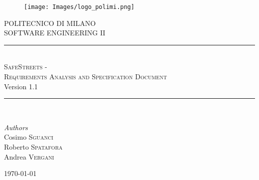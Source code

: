 \documentclass[11pt,a4paper]{article}
\begin{document}
\begin{figure}[t]
    \texttt{[image: Images/logo\_polimi.png]}
    \centering
\end{figure}

\begin{titlepage}
    \newcommand{\HRule}{\rule{\linewidth}{0.4mm}}
    \center
    \textsc{\LARGE POLITECNICO DI MILANO}\\[1.5cm]
	
	\textsc{\Large SOFTWARE ENGINEERING II}\\[0.5cm]
	
	\HRule\\[0.4cm]
	    {\huge \textsc{SafeStreets - \\[0.2cm]Requirements Analysis and Specification Document}}\\[0.4cm]
	    Version 1.1
    \HRule\\[1.5cm]
	
	\begin{minipage}{1\textwidth}
		\begin{flushleft}
			\large
			\textit{Authors}\\
			Cosimo \textsc{Sguanci}\\
			Roberto \textsc{Spatafora}\\
			Andrea \textsc{Vergani}
		\end{flushleft}
	\end{minipage}
	
	\vfill\vfill\vfill %
	
	{\large\today}
	
\end{titlepage}


\newpage

\tableofcontents


%
%
%
%

%
\end{document}
